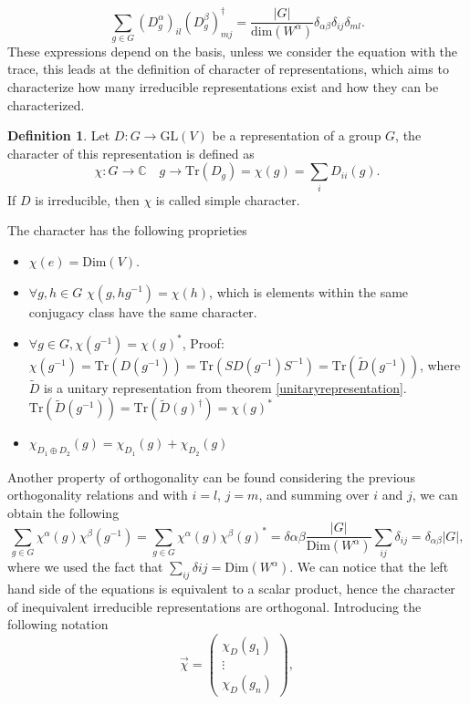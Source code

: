 \documentclass[12pt]{book}
\theoremstyle{plain}
\newcommand{\C}{\mathbb{C}}
\theoremstyle{definition}
\newtheorem{dfn}[thm]{Definition}
\theoremstyle{remark}
\begin{document}
\[\sum_{g\in G}\left(D_g^\alpha\right)_{il}\left(D_{g}^\beta\right)_{mj}^\dagger = \frac{|G|}{\text{dim}(W^{\alpha})} \delta_{\alpha\beta}\delta_{ij}\delta_{ml}.\]
These expressions depend on the basis, unless we consider the equation with the trace, this leads at the definition of character of representations, which aims to characterize how many irreducible representations exist and how they can be characterized.
\begin{dfn}
Let $D:G\to \text{GL}(V)$ be a representation of a group $G$, the character of this representation is defined as
\[\chi:G \to \C \quad g\to \text{Tr}(D_g) = \chi(g) = \sum_i D_{ii}(g).\]
If $D$ is irreducible, then $\chi$ is called simple character.
\end{dfn}
The character has the following proprieties
\begin{itemize}
\item $\chi(e) = \text{Dim}(V)$.
\item $\forall g,h\in G$ $\chi(g,hg^{-1}) = \chi(h)$, which is elements within the same conjugacy class have the same character.
\item $\forall g\in G, \chi(g^{-1}) = \chi(g)^*$, Proof: $\chi(g^{-1}) = \text{Tr}(D(g^{-1})) = \text{Tr}(SD(g^{-1})S^{-1}) = \text{Tr}(\widetilde{D}(g^{-1}))$, where $\widetilde{D}$ is a unitary representation from theorem \ref{unitaryrepresentation}. $\text{Tr}(\widetilde{D}(g^{-1})) = \text{Tr}(\widetilde{D}(g)^\dagger) = \chi(g)^*$
\item $\chi_{D_1 \oplus D_2}(g) = \chi_{D_1}(g) + \chi_{D_2}(g)$
\end{itemize}
Another property of orthogonality can be found considering the previous orthogonality relations and with $i=l$, $j=m$, and summing over $i$ and $j$, we can obtain the following
\begin{equation}\label{nonsonooriginale}\sum_{g\in G}\chi^\alpha (g) \chi^\beta(g^{-1}) = \sum_{g\in G} \chi^\alpha (g) \chi^\beta(g)^* = \delta{\alpha\beta}\frac{|G|}{\text{Dim}(W^\alpha)}\sum_{ij}\delta_{ij} = \delta_{\alpha\beta}|G|,\end{equation}
where we used the fact that $\sum_{ij}\delta{ij} = \text{Dim}(W^\alpha)$. We can notice that the left hand side of the equations is equivalent to a scalar product, hence the character of inequivalent irreducible representations are orthogonal. Introducing the following notation
\[\overrightarrow{\chi}  = \begin{pmatrix}\chi_D(g_1)\\ \vdots \\ \chi_D(g_n)\end{pmatrix},\]
\end{document}
